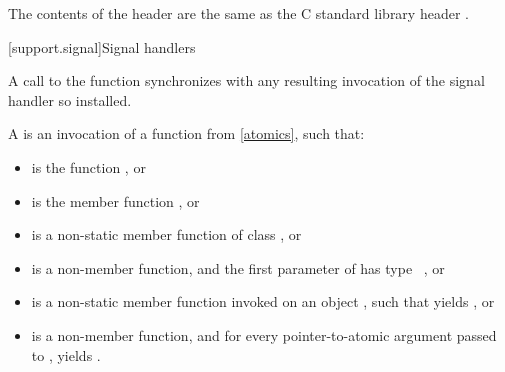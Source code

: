 \pnum
The contents of the header  are the same as the C
standard library header .

[support.signal]{Signal handlers}

\pnum
A call to the function  synchronizes with any resulting
invocation of the signal handler so installed.

\pnum
A  is
an invocation of a function  from \ref{atomics},
such that:
\begin{itemize}
\item
{} is the function , or

\item
{} is the member function , or

\item
{} is a non-static member function of class , or

\item
{} is a non-member function, and
the first parameter of  has type \cv{}~, or

\item
{} is a non-static member function invoked on an object ,
such that  yields , or

\item
{} is a non-member function, and
for every pointer-to-atomic argument  passed to ,
 yields .
\end{itemize}

